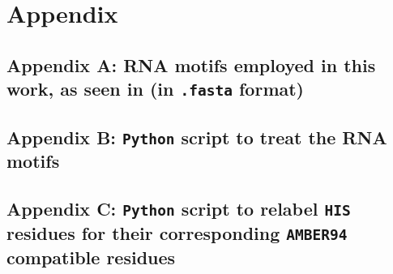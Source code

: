 \setcounter{page}{1}

\section{Appendix}

 

\subsection*{Appendix A: RNA motifs employed in this work, as seen in \cite{dolcemascolo_2022} (in \texttt{.fasta} format)}\label{appendix_A}



\subsection*{Appendix B: \texttt{Python} script to treat the RNA motifs}\label{appendix_B}



\subsection*{Appendix C: \texttt{Python} script to relabel \texttt{HIS} residues for their corresponding \texttt{AMBER94} compatible residues}\label{appendix_C}
\label{appendix_C}




